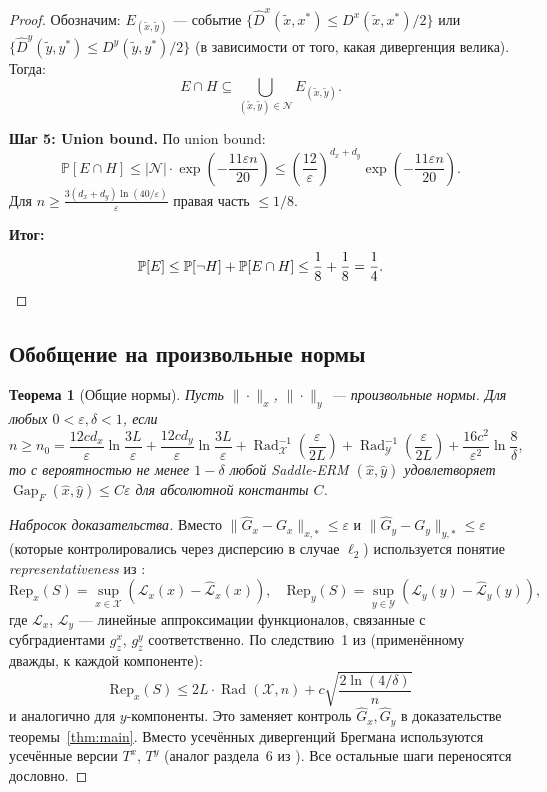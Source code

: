\documentclass[12pt,a4paper]{article}
\theoremstyle{plain}
\newtheorem{theorem}{Теорема}[section]
\theoremstyle{definition}
\DeclareMathOperator{\Gap}{Gap}
\DeclareMathOperator{\Rad}{Rad}
\renewcommand{\Pr}{\mathbb{P}}
\newcommand{\cX}{\mathcal{X}}
\newcommand{\cY}{\mathcal{Y}}
\newcommand{\cN}{\mathcal{N}}
\newcommand{\hatD}{\hat{D}}
\newcommand{\hatG}{\hat{G}}
\begin{document}
\begin{proof}
Обозначим: $E_{(\tilde{x},\tilde{y})}$ --- событие $\{\hatD^x(\tilde{x},x^*)\le D^x(\tilde{x},x^*)/2\}$ или $\{\hatD^y(\tilde{y},y^*)\le D^y(\tilde{y},y^*)/2\}$ (в зависимости от того, какая дивергенция велика). Тогда:
\[
    E\cap H\subseteq\bigcup_{(\tilde{x},\tilde{y})\in\cN}E_{(\tilde{x},\tilde{y})}.
\]

\textbf{Шаг 5: Union bound.}
По union bound:
\[
    \Pr[E\cap H]\le|\cN|\cdot\exp\!\left(-\frac{11\varepsilon n}{20}\right)\le\left(\frac{12}{\varepsilon}\right)^{d_x+d_y}\exp\!\left(-\frac{11\varepsilon n}{20}\right).
\]
Для $n\ge\frac{3(d_x+d_y)\ln(40/\varepsilon)}{\varepsilon}$ правая часть $\le 1/8$.

\textbf{Итог:}
\[
    \Pr[E]\le\Pr[\neg H]+\Pr[E\cap H]\le\frac{1}{8}+\frac{1}{8}=\frac{1}{4}.\qedhere
\]
\end{proof}

\subsection{Обобщение на произвольные нормы}

\begin{theorem}[Общие нормы]
\label{thm:general_norm}
Пусть $\|\cdot\|_x$, $\|\cdot\|_y$ --- произвольные нормы. Для любых $0<\varepsilon,\delta<1$, если
\[
    n\ge n_0=\frac{12cd_x}{\varepsilon}\ln\frac{3L}{\varepsilon}+\frac{12cd_y}{\varepsilon}\ln\frac{3L}{\varepsilon}+\Rad_{\cX}^{-1}\!\left(\frac{\varepsilon}{2L}\right)+\Rad_{\cY}^{-1}\!\left(\frac{\varepsilon}{2L}\right)+\frac{16c^2}{\varepsilon^2}\ln\frac{8}{\delta},
\]
то с вероятностью не менее $1-\delta$ любой Saddle-ERM $(\hat{x},\hat{y})$ удовлетворяет $\Gap_F(\hat{x},\hat{y})\le C\varepsilon$ для абсолютной константы $C$.
\end{theorem}

\begin{proof}[Набросок доказательства]
Вместо $\|\hatG_x-G_x\|_{x,*}\le\varepsilon$ и $\|\hatG_y-G_y\|_{y,*}\le\varepsilon$ (которые контролировались через дисперсию в случае $\ell_2$) используется понятие \emph{representativeness} из \cite{CLY2023}:
\[
    \mathrm{Rep}_x(S)=\sup_{x\in\cX}(\mathcal{L}_x(x)-\hat{\mathcal{L}}_x(x)),\quad
    \mathrm{Rep}_y(S)=\sup_{y\in\cY}(\mathcal{L}_y(y)-\hat{\mathcal{L}}_y(y)),
\]
где $\mathcal{L}_x$, $\mathcal{L}_y$ --- линейные аппроксимации функционалов, связанные с субградиентами $g_z^x$, $g_z^y$ соответственно. По следствию~1 из \cite{CLY2023} (применённому дважды, к каждой компоненте):
\[
    \mathrm{Rep}_x(S)\le 2L\cdot\Rad(\cX,n)+c\sqrt{\frac{2\ln(4/\delta)}{n}}
\]
и аналогично для $y$-компоненты. Это заменяет контроль $\hatG_x,\hatG_y$ в доказательстве теоремы~\ref{thm:main}. Вместо усечённых дивергенций Брегмана используются усечённые версии $T^x$, $T^y$ (аналог раздела~6 из \cite{CLY2023}). Все остальные шаги переносятся дословно.
\end{proof}
\end{document}

